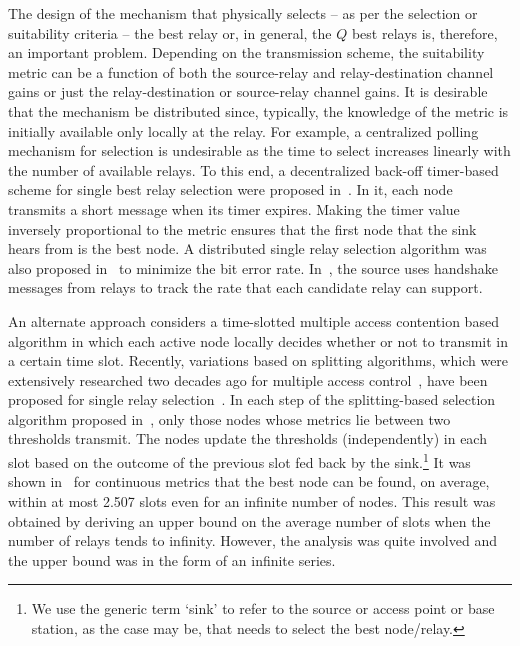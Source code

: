 \documentclass[12pt,draftcls,peerreview, onecolumn]{IEEEtran}
\begin{document}
The design of the mechanism that physically selects -- as per the
selection or suitability criteria -- the best relay or, in general,
the $Q$ best relays is, therefore, an important problem. Depending on
the transmission scheme, the suitability metric can be a function of
both the source-relay and relay-destination channel gains or just the
relay-destination or source-relay channel gains. It is desirable that
the mechanism be distributed since, typically, the knowledge of the
metric is initially available only locally at the relay.  For example,
a centralized polling mechanism for selection is undesirable as the
time to select increases linearly with the number of available relays.
To this end, a decentralized back-off timer-based scheme for single
best relay selection were proposed in~\cite{bletsas_jsac_2006}. In it,
each node transmits a short message when its timer expires. Making the
timer value inversely proportional to the metric ensures that the
first node that the sink hears from is the best node.  A distributed
single relay selection algorithm was also proposed
in~\cite{krikidis_CL_2007} to minimize the bit error rate.
In~\cite{liu_2006_TWC}, the source uses handshake messages from relays
to track the rate that each candidate relay can support.



An alternate approach considers a time-slotted multiple access
contention based algorithm in which each active node locally decides
whether or not to transmit in a certain time slot.  Recently,
variations based on splitting algorithms, which were extensively
researched two decades ago for multiple access control~\cite[Chp.\ 
4]{bertsekas_gallager}, have been proposed for single relay
selection~\cite{qin_infocomm_2004,yim_TWC_2009_VPMAS}. In each step of
the splitting-based selection algorithm proposed
in~\cite{qin_infocomm_2004}, only those nodes whose metrics lie
between two thresholds transmit. The nodes update the thresholds
(independently) in each slot based on the outcome of the previous slot
fed back by the sink.\footnote{We use the generic term `sink' to refer
  to the source or access point or base station, as the case may be,
  that needs to select the best node/relay.} It was shown
in~\cite{qin_infocomm_2004} for continuous metrics that the best node
can be found, on average, within at most 2.507 slots even for an
infinite number of nodes.  This result was obtained by deriving an
upper bound on the average number of slots when the number of relays
tends to infinity. However, the analysis was quite involved and the
upper bound was in the form of an infinite series.
\end{document}

